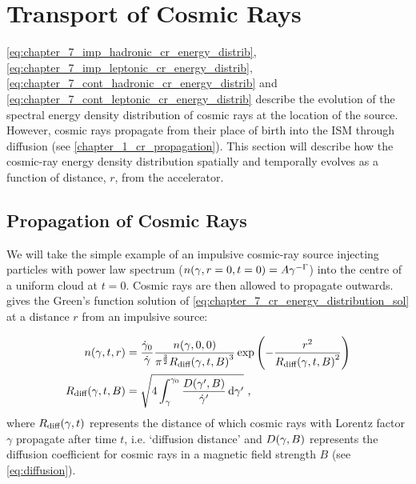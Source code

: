 \section{Transport of Cosmic Rays} \label{sec:chapter_7_cr_SED_trans} 

\autoref{eq:chapter_7_imp_hadronic_cr_energy_distrib}, \autoref{eq:chapter_7_imp_leptonic_cr_energy_distrib}, \autoref{eq:chapter_7_cont_hadronic_cr_energy_distrib} and \autoref{eq:chapter_7_cont_leptonic_cr_energy_distrib} describe the evolution of the spectral energy density distribution of cosmic rays at the location of the source. However, cosmic rays propagate from their place of birth into the ISM through diffusion (see \autoref{chapter_1_cr_propagation}). This section will describe how the cosmic-ray energy density distribution spatially and temporally evolves as a function of distance, $r$, from the accelerator.

\subsection{Propagation of Cosmic Rays}

We will take the simple example of an impulsive cosmic-ray source injecting particles with power law spectrum ($n\qty(\gamma,r=0,t=0)=A\gamma^{-\Gamma}$) into the centre of a uniform cloud at $t=0$. Cosmic rays are then allowed to propagate outwards. \cite{1995PhRvD..52.3265A} gives the Green's function solution of \autoref{eq:chapter_7_cr_energy_distribution_sol} at a distance $r$ from an impulsive source:

\begin{subequations}
	\begin{align}
	n\qty(\gamma,t,r)&=\frac{\dot{\gamma}_0}{\dot{\gamma}}\frac{n\qty(\gamma,0,0)}{\pi^{\frac{3}{2}}R_\text{diff}\qty(\gamma,t,B)^3}\exp\qty(-\frac{r^2}{R_\text{diff}\qty(\gamma,t,B)^2}) \label{eq:chapter_7_cr_ev_green_solution} \\
	R_\text{diff}\qty(\gamma,t,B)&=\sqrt{4\int_\gamma^{\gamma_0}\frac{D\qty(\gamma',B)}{\dot{\gamma}'}\dd{\gamma'}}\text{ ,} \label{eq:chapter_7_R_ev_green_solution}
	\end{align}
\end{subequations}  
\noindent where $R_\text{diff}\qty(\gamma,t)$ represents the distance of which cosmic rays with Lorentz factor $\gamma$ propagate after time $t$, i.e. `diffusion distance' and $D\qty(\gamma,B)$ represents the diffusion coefficient for cosmic rays in a magnetic field strength $B$ (see \autoref{eq:diffusion}).


